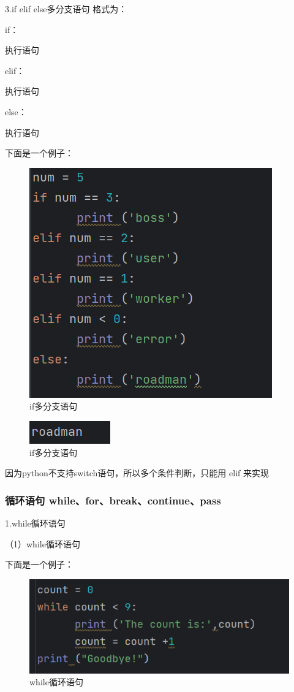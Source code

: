 \documentclass{ctexart}
\begin{document}
	3.if elif else多分支语句 格式为：
	
	if：
	
	\quad \quad 执行语句
	
	elif：
	
	\quad \quad 执行语句
	
	else：
	
	\quad \quad 执行语句
	
	下面是一个例子：
	
	\begin{figure}[H]
		\centering
		\includegraphics[scale=0.5]{3.13}
		\caption{if多分支语句}
	\end{figure}
	
	\begin{figure}[H]
		\centering
		\includegraphics[scale=0.5]{3.14}
		\caption{if多分支语句}
	\end{figure}
	
	因为python不支持switch语句，所以多个条件判断，只能用 elif 来实现
	
	\subsubsection{循环语句 while、for、break、continue、pass}
	
	1.while循环语句
	
	（1）while循环语句
	
	下面是一个例子：
	
	\begin{figure}[H]
		\centering
		\includegraphics[scale=0.5]{3.15}
		\caption{while循环语句}
	\end{figure}
	
\end{document}
